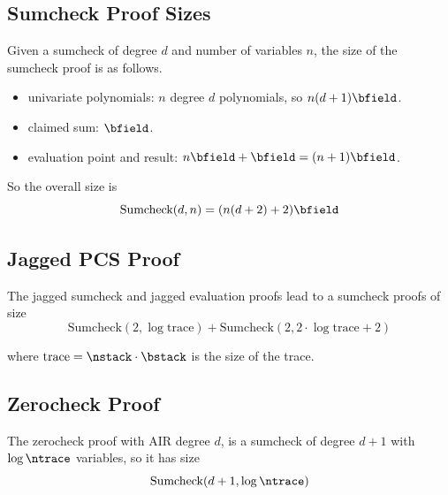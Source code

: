 \subsection{Sumcheck Proof Sizes}

Given a sumcheck of degree $d$ and number of variables $n$, the size of the sumcheck proof is as follows.
\begin{itemize}
    \item univariate polynomials: $n$ degree $d$ polynomials, so $n(d+1)\bfield$.
    \item claimed sum: $\bfield$.
    \item evaluation point and result: $n\bfield + \bfield = (n+1)\bfield$.
\end{itemize}

So the overall size is
$$\text{Sumcheck}(d, n) = (n(d+2)+2)\bfield$$

\subsection{Jagged PCS Proof}

The jagged sumcheck and jagged evaluation proofs lead to a sumcheck proofs of size
$$\text{Sumcheck}(2, \log \text{trace}) + \text{Sumcheck}(2, 2 \cdot \log \text{trace} + 2)$$

where $\text{trace} = \nstack \cdot \bstack$ is the size of the trace.

\subsection{Zerocheck Proof}

The zerocheck proof with AIR degree $d$, is a sumcheck of degree $d+1$ with $\log \ntrace$ variables, so it has size
$$\text{Sumcheck}(d + 1, \log \ntrace)$$
